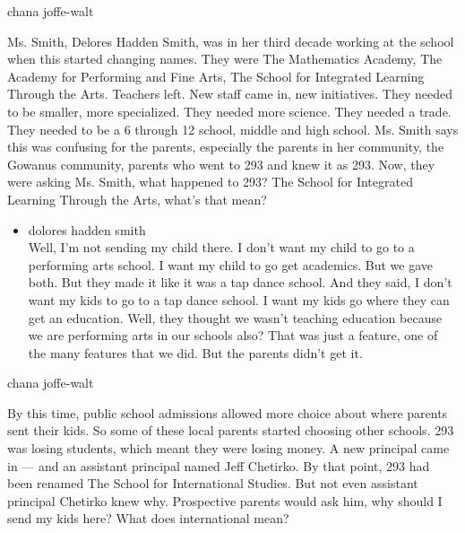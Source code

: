 chana joffe-walt

Ms. Smith, Delores Hadden Smith, was in her third decade working at the
school when this started changing names. They were The Mathematics
Academy, The Academy for Performing and Fine Arts, The School for
Integrated Learning Through the Arts. Teachers left. New staff came in,
new initiatives. They needed to be smaller, more specialized. They
needed more science. They needed a trade. They needed to be a 6 through
12 school, middle and high school. Ms. Smith says this was confusing for
the parents, especially the parents in her community, the Gowanus
community, parents who went to 293 and knew it as 293. Now, they were
asking Ms. Smith, what happened to 293? The School for Integrated
Learning Through the Arts, what's that mean?

\begin{itemize}
\tightlist
\item
  dolores hadden smith\\
  Well, I'm not sending my child there. I don't want my child to go to a
  performing arts school. I want my child to go get academics. But we
  gave both. But they made it like it was a tap dance school. And they
  said, I don't want my kids to go to a tap dance school. I want my kids
  go where they can get an education. Well, they thought we wasn't
  teaching education because we are performing arts in our schools also?
  That was just a feature, one of the many features that we did. But the
  parents didn't get it.
\end{itemize}

chana joffe-walt

By this time, public school admissions allowed more choice about where
parents sent their kids. So some of these local parents started choosing
other schools. 293 was losing students, which meant they were losing
money. A new principal came in --- and an assistant principal named Jeff
Chetirko. By that point, 293 had been renamed The School for
International Studies. But not even assistant principal Chetirko knew
why. Prospective parents would ask him, why should I send my kids here?
What does international mean?

